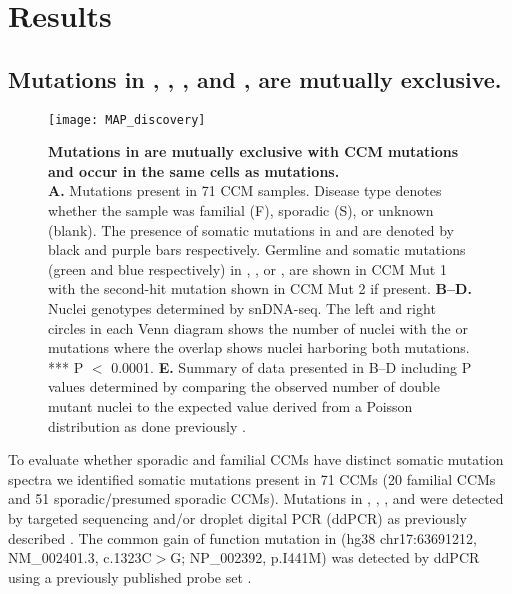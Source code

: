 \section{Results}
\subsection{Mutations in , , , and , are mutually exclusive.}

\begin{figure}[tbh]
\centering
\texttt{[image: MAP\_discovery]}
\caption{\textbf{Mutations in  are mutually exclusive with CCM mutations and occur in the same cells as  mutations.\\} 
\textbf{A.} Mutations present in 71 CCM samples. Disease type denotes whether the sample was familial (F), sporadic (S), or unknown (blank). The presence of somatic mutations in  and  are denoted by black and purple bars respectively. Germline and somatic mutations (green and blue respectively) in , , or , are shown in CCM Mut 1 with the second-hit mutation shown in CCM Mut 2 if present. \textbf{B--D.} Nuclei genotypes determined by snDNA-seq. The left and right circles in each Venn diagram shows the number of nuclei with the  or  mutations where the overlap shows nuclei harboring both mutations. *** P $<$ 0.0001. \textbf{E.} Summary of data presented in B--D including P values determined by comparing the observed number of double mutant nuclei to the expected value derived from a Poisson distribution as done previously \citep{ren2021}. }

\label{MAP_discovery}
\end{figure}

To evaluate whether sporadic and familial CCMs have distinct somatic mutation spectra we identified somatic mutations present in 71 CCMs (20 familial CCMs and 51 sporadic/presumed sporadic CCMs). Mutations in , , , and  were detected by targeted sequencing and/or droplet digital PCR (ddPCR) as previously described \citep{ren2021}. The common gain of function mutation in  (hg38 chr17:63691212, NM\_002401.3, c.1323C$>$G; NP\_002392, p.I441M) was detected by ddPCR using a previously published probe set \citep{couto2015}. 


